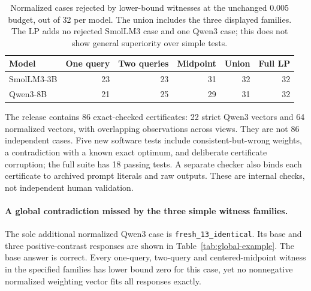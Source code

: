 \begin{table}[H]\centering\small
\begin{tabular}{@{}lrrrrr@{}}\toprule
Model & One query & Two queries & Midpoint & Union & Full LP\\\midrule
SmolLM3-3B & 23 & 23 & 31 & 32 & 32\\
Qwen3-8B & 21 & 25 & 29 & 31 & 32\\
\bottomrule\end{tabular}
\caption{Normalized cases rejected by lower-bound witnesses at the unchanged 0.005 budget, out of 32 per model. The union includes the three displayed families. The LP adds no rejected SmolLM3 case and one Qwen3 case; this does not show general superiority over simple tests.}\label{tab:simple-witnesses}\end{table}

The release contains 86 exact-checked certificates: 22 strict Qwen3 vectors and 64 normalized vectors, with overlapping observations across views. They are not 86 independent cases. Five new software tests include consistent-but-wrong weights, a contradiction with a known exact optimum, and deliberate certificate corruption; the full suite has 18 passing tests. A separate checker also binds each certificate to archived prompt literals and raw outputs. These are internal checks, not independent human validation.

\paragraph{A global contradiction missed by the three simple witness families.} The sole additional normalized Qwen3 case is \texttt{fresh\_13\_identical}. Its base and three positive-contrast responses are shown in Table~\ref{tab:global-example}. The base answer is correct. Every one-query, two-query and centered-midpoint witness in the specified families has lower bound zero for this case, yet no nonnegative normalized weighting vector fits all responses exactly.

